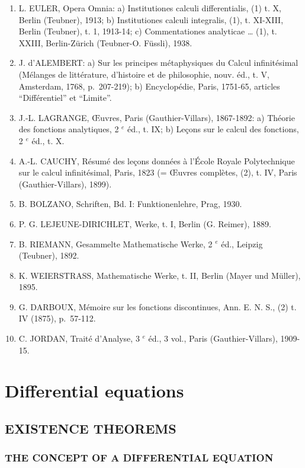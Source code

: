 \begin{enumerate}
\def\labelenumi{(\Roman{enumi})}
\setcounter{enumi}{24}
\item
  L. EULER, Opera Omnia: a) Institutiones calculi differentialis, (1) t. X, Berlin (Teubner), 1913; b) Institutiones calculi integralis, (1), t. XI-XIII, Berlin (Teubner), t. 1, 1913-14; c) Commentationes analyticae \ldots{} (1), t. XXIII, Berlin-Zürich (Teubner-O. Füssli), 1938.
\item
  J. d'ALEMBERT: a) Sur les principes métaphysiques du Calcul infinitésimal (Mélanges de littérature, d'histoire et de philosophie, nouv. éd., t. V, Amsterdam, 1768, p.~207-219); b) Encyclopédie, Paris, 1751-65, articles ``Différentiel'' et ``Limite''.
\item
  J.-L. LAGRANGE, Œuvres, Paris (Gauthier-Villars), 1867-1892: a) Théorie des fonctions analytiques, 2 \(^{e}\) éd., t. IX; b) Leçons sur le calcul des fonctions, 2 \(^{e}\) éd., t. X.
\item
  A.-L. CAUCHY, Résumé des leçons données à l'École Royale Polytechnique sur le calcul infinitésimal, Paris, 1823 (= Œuvres complètes, (2), t. IV, Paris (Gauthier-Villars), 1899).
\item
  B. BOLZANO, Schriften, Bd. I: Funktionenlehre, Prag, 1930.
\item
  P. G. LEJEUNE-DIRICHLET, Werke, t. I, Berlin (G. Reimer), 1889.
\item
  B. RIEMANN, Gesammelte Mathematische Werke, 2 \(^{e}\) éd., Leipzig (Teubner), 1892.
\item
  K. WEIERSTRASS, Mathematische Werke, t. II, Berlin (Mayer und Müller), 1895.
\item
  G. DARBOUX, Mémoire sur les fonctions discontinues, Ann. E. N. S., (2) t. IV (1875), p.~57-112.
\item
  C. JORDAN, Traité d'Analyse, 3 \(^{e}\) éd., 3 vol., Paris (Gauthier-Villars), 1909-15.
\end{enumerate}

\chapter{Differential equations}

\section{EXISTENCE THEOREMS}

\subsection{THE CONCEPT OF A DIFFERENTIAL EQUATION}

